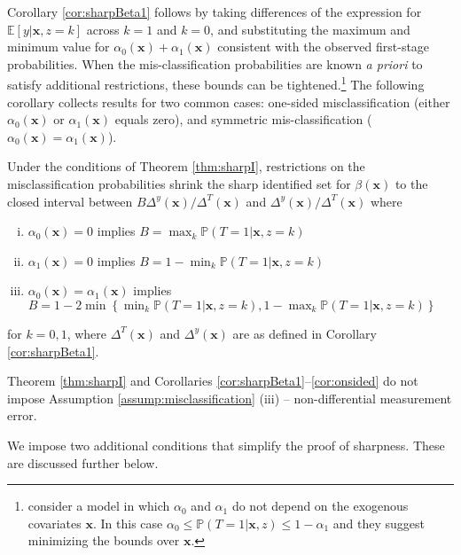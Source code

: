 Corollary \ref{cor:sharpBeta1} follows by taking differences of the expression for $\mathbb{E}[y|\mathbf{x},z=k]$ across $k=1$ and $k=0$, and substituting the maximum and minimum value for $\alpha_0(\mathbf{x}) + \alpha_1(\mathbf{x})$ consistent with the observed first-stage probabilities.
When the mis-classification probabilities are known \emph{a priori} to satisfy additional restrictions, these bounds can be tightened.\footnote{\cite{FL} consider a model in which $\alpha_0$ and $\alpha_1$ do not depend on the exogenous covariates $\mathbf{x}$. In this case $\alpha_0 \leq \mathbb{P}(T=1|\mathbf{x},z)\leq 1 - \alpha_1$ and they suggest minimizing the bounds over $\mathbf{x}$.}
The following corollary collects results for two common cases: one-sided misclassification (either $\alpha_0(\mathbf{x})$ or $\alpha_1(\mathbf{x})$ equals zero), and symmetric mis-classification ($\alpha_0(\mathbf{x}) = \alpha_1(\mathbf{x})$).

\begin{cor}
  \label{cor:onsided}
  Under the conditions of Theorem \ref{thm:sharpI}, restrictions on the misclassification probabilities shrink the sharp identified set for $\beta(\mathbf{x})$ to the closed interval between $B\Delta^y(\mathbf{x})/\Delta^T(\mathbf{x})$ and $\Delta^y(\mathbf{x})/\Delta^T(\mathbf{x})$ where
  \begin{enumerate}[(i)]
    \item $\alpha_0(\mathbf{x})=0$ implies $B = \max_k \mathbb{P}(T=1|\mathbf{x},z=k)$ 
    \item $\alpha_1(\mathbf{x})=0$ implies $B = 1 - \min_k \mathbb{P}(T=1|\mathbf{x},z=k)$ 
    \item $\alpha_0(\mathbf{x})=\alpha_1(\mathbf{x})$ implies $B =  1 - 2 \min\left\{ \min_k \mathbb{P}(T=1|\mathbf{x},z=k), 1 - \max_k \mathbb{P}(T=1|\mathbf{x},z=k) \right\}$ 
  \end{enumerate}
  for $k = 0,1$, where $\Delta^T(\mathbf{x})$ and $\Delta^y(\mathbf{x})$ are as defined in Corollary \ref{cor:sharpBeta1}.
\end{cor}

Theorem \ref{thm:sharpI} and Corollaries \ref{cor:sharpBeta1}--\ref{cor:onsided} do not impose Assumption \ref{assump:misclassification} (iii) -- non-differential measurement error.

We impose two additional conditions that simplify the proof of sharpness.
These are discussed further below.


